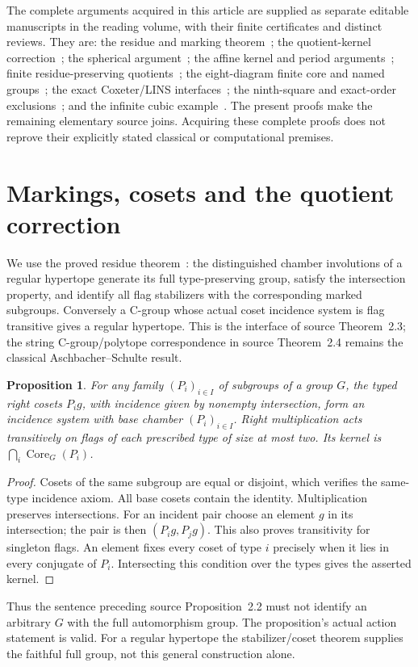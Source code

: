 \documentclass[11pt,a4paper]{article}
\newtheorem{proposition}[theorem]{Proposition}
\begin{document}
The complete arguments acquired in this article are supplied as separate
editable manuscripts in the reading volume, with their finite certificates
and distinct reviews. They are: the residue and marking theorem~\cite{residue};
the quotient-kernel correction~\cite{kernel}; the spherical argument~\cite{spherical};
the affine kernel and period arguments~\cite{translation,period}; finite
residue-preserving quotients~\cite{existence}; the eight-diagram finite core
and named groups~\cite{core,names}; the exact Coxeter/LINS interfaces~\cite{methods};
the ninth-square and exact-order exclusions~\cite{square,divisor}; and the
infinite cubic example~\cite{cubes}. The present proofs make the remaining
elementary source joins. Acquiring these complete proofs does not reprove
their explicitly stated classical or computational premises.

\section{Markings, cosets and the quotient correction}\label{markings}
We use the proved residue theorem~\cite{residue}: the distinguished chamber
involutions of a regular hypertope generate its full type-preserving group,
satisfy the intersection property, and identify all flag stabilizers with
the corresponding marked subgroups. Conversely a C-group whose actual coset
incidence system is flag transitive gives a regular hypertope. This is the
interface of source Theorem~2.3; the string C-group/polytope correspondence
in source Theorem~2.4 remains the classical Aschbacher--Schulte result.

\begin{proposition}\label{cosets}
For any family $(P_i)_{i\in I}$ of subgroups of a group $G$, the typed
right cosets $P_i g$, with incidence given by nonempty intersection, form
an incidence system with base chamber $(P_i)_{i\in I}$. Right multiplication
acts transitively on flags of each prescribed type of size at most two.
Its kernel is $\bigcap_i\operatorname{Core}_G(P_i)$.
\end{proposition}
\begin{proof}
Cosets of the same subgroup are equal or disjoint, which verifies the
same-type incidence axiom. All base cosets contain the identity.
Multiplication preserves intersections. For an incident pair choose an
element $g$ in its intersection; the pair is then $(P_i g,P_j g)$.
This also proves transitivity for singleton flags. An element fixes every
coset of type $i$ precisely when it lies in every conjugate of $P_i$.
Intersecting this condition over the types gives the asserted kernel.
\end{proof}
Thus the sentence preceding source Proposition~2.2 must not identify an
arbitrary $G$ with the full automorphism group. The proposition's actual
action statement is valid. For a regular hypertope the stabilizer/coset
theorem supplies the faithful full group, not this general construction alone.
\end{document}
